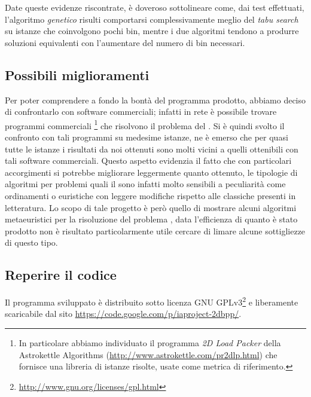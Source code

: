 Date queste evidenze riscontrate, è doveroso sottolineare come, dai test effettuati, l'algoritmo \emph{genetico} risulti comportarsi complessivamente meglio del \emph{tabu search} su istanze che coinvolgono pochi bin, mentre i due algoritmi tendono a produrre soluzioni equivalenti con l'aumentare del numero di bin necessari.

\subsection{Possibili miglioramenti}
Per poter comprendere a fondo la bontà del programma prodotto, abbiamo deciso di confrontarlo con software commerciali; infatti in rete è possibile trovare programmi commerciali \footnote{In particolare abbiamo individuato il programma \emph{2D Load Packer} della Astrokettle Algorithms (\url{http://www.astrokettle.com/pr2dlp.html}) che fornisce una libreria di istanze risolte, usate come metrica di riferimento.} che risolvono il problema del \ddbp. Si è quindi svolto il confronto con tali programmi su medesime istanze, ne è emerso che per quasi tutte le istanze i risultati da noi ottenuti sono molti vicini a quelli ottenibili con tali software commerciali. Questo aspetto evidenzia il fatto che con particolari accorgimenti si potrebbe migliorare leggermente quanto ottenuto, le tipologie di algoritmi per problemi quali il \ddbp sono infatti molto sensibili a peculiarità come ordinamenti o euristiche con leggere modifiche rispetto alle classiche presenti in letteratura. 
Lo scopo di tale progetto è però quello di mostrare alcuni algoritmi metaeuristici per la risoluzione del problema \ddbp , data l'efficienza di quanto è stato prodotto non è risultato particolarmente utile cercare di limare alcune sottigliezze di questo tipo.

\subsection{Reperire il codice}
Il programma sviluppato è distribuito sotto licenza GNU GPLv3\footnote{\url{http://www.gnu.org/licenses/gpl.html}} e liberamente scaricabile dal sito \url{https://code.google.com/p/iaproject-2dbpp/}.